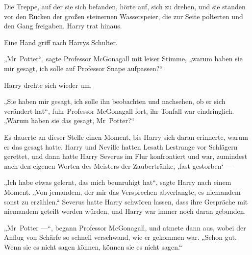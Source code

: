 Die Treppe, auf der sie sich befanden, hörte auf, sich zu drehen, und sie standen vor den Rücken der großen steinernen Wasserspeier, die zur Seite polterten und den Gang freigaben. Harry trat hinaus.

Eine Hand griff nach Harrys Schulter.

„Mr~Potter“, sagte Professor McGonagall mit leiser Stimme, „warum haben sie mir gesagt, ich solle auf Professor Snape aufpassen?“

Harry drehte sich wieder um.

„Sie haben mir gesagt, ich solle ihn beobachten und nachsehen, ob er sich verändert hat“, fuhr Professor McGonagall fort, ihr Tonfall war eindringlich.
„Warum haben sie das gesagt, Mr~Potter?“

Es dauerte an dieser Stelle einen Moment, bis Harry sich daran erinnerte, warum er das gesagt hatte. Harry und Neville hatten Lesath Lestrange vor Schlägern gerettet, und dann hatte Harry Severus im Flur konfrontiert und war, zumindest nach den eigenen Worten des Meisters der Zaubertränke, ‚fast gestorben‘ —

„Ich habe etwas gelernt, das mich beunruhigt hat“, sagte Harry nach einem Moment.
„Von jemandem, der mir das Versprechen abverlangte, es niemandem sonst zu erzählen.“
Severus hatte Harry schwören lassen, dass ihre Gespräche mit niemandem geteilt werden würden, und Harry war immer noch daran gebunden.

„Mr~Potter —“, begann Professor McGonagall, und atmete dann aus, wobei der Anflug von Schärfe so schnell verschwand, wie er gekommen war.
„Schon gut. Wenn sie es nicht sagen können, können sie es nicht sagen.“

